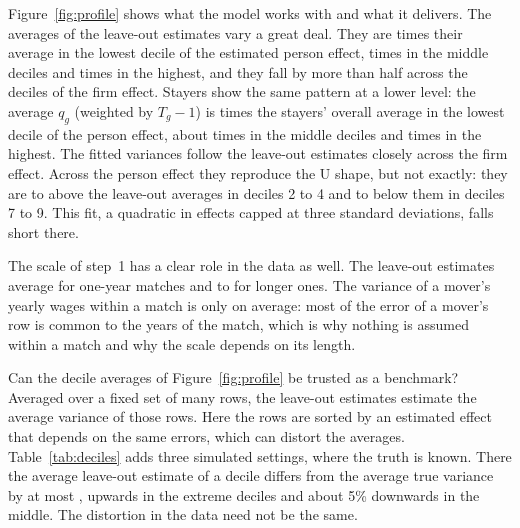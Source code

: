 Figure~\ref{fig:profile} shows what the model works with and what it delivers. The averages of the leave-out
estimates vary a great deal. They are  times their average in the lowest decile of the
estimated person effect,  times in the middle deciles and  times in the
highest, and they fall by more than half across the deciles of the firm effect. Stayers show the same pattern
at a lower level: the average $q_g$ (weighted by $T_g-1$) is  times the stayers' overall average in the
lowest decile of the person effect, about  times in the middle deciles and
 times in the highest. The fitted variances follow the leave-out estimates closely
across the firm effect. Across the person effect they reproduce the U shape, but not exactly: they are
 to  above the leave-out averages in deciles 2 to 4 and
 to  below them in deciles 7 to 9. This fit, a quadratic in effects capped at three standard deviations, falls short there.

The scale of step~1 has a clear role in the data as well. The leave-out estimates average  for
one-year matches and  to  for longer ones. The variance of a mover's
yearly wages within a match is only  on average: most of the error of a mover's row is
common to the years of the match, which is why nothing is assumed within a match and why the scale depends on
its length.

Can the decile averages of Figure~\ref{fig:profile} be trusted as a benchmark? Averaged over a fixed set of many
rows, the leave-out estimates estimate the average variance of those rows. Here the rows are sorted by an
estimated effect that depends on the same errors, which can distort the averages. Table~\ref{tab:deciles} adds
three simulated settings, where the truth is known. There the average leave-out estimate of a decile differs
from the average true variance by at most , upwards in the extreme deciles and about 5\%
downwards in the middle. The distortion in the data need not be the same.

